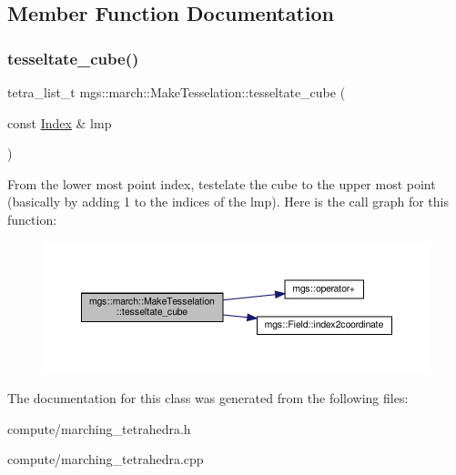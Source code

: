 \subsection{Member Function Documentation}
\mbox{\label{classmgs_1_1march_1_1MakeTesselation_ace6aa58a0636038e85d187de142e1aa9}} 
\subsubsection{\texorpdfstring{tesseltate\+\_\+cube()}{tesseltate\_cube()}}
{\footnotesize\ttfamily tetra\+\_\+list\+\_\+t mgs\+::march\+::\+Make\+Tesselation\+::tesseltate\+\_\+cube (\begin{DoxyParamCaption}\item[{const \hyperlink{structmgs_1_1Index}{Index} \&}]{lmp }\end{DoxyParamCaption})}

From the lower most point index, testelate the cube to the upper most point (basically by adding 1 to the indices of the lmp). Here is the call graph for this function\+:
\nopagebreak
\begin{figure}[H]
\begin{center}
\leavevmode
\includegraphics[width=350pt]{classmgs_1_1march_1_1MakeTesselation_ace6aa58a0636038e85d187de142e1aa9_cgraph}
\end{center}
\end{figure}


The documentation for this class was generated from the following files\+:\begin{DoxyCompactItemize}
\item 
compute/marching\+\_\+tetrahedra.\+h\item 
compute/marching\+\_\+tetrahedra.\+cpp\end{DoxyCompactItemize}
